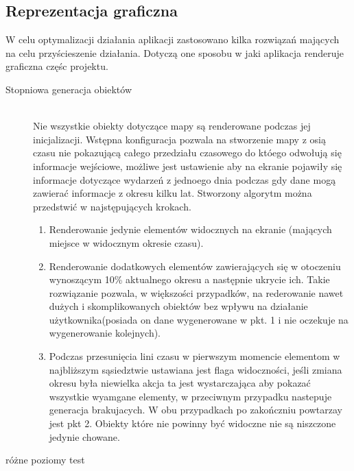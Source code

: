 \subsection{Reprezentacja graficzna}
\label{subsec:showing}

W celu optymalizacji działania aplikacji zastosowano kilka rozwiązań mających na celu przyścieszenie działania. Dotyczą one sposobu w jaki aplikacja renderuje graficzna częśc projektu.


\begin{description}
\item[Stopniowa generacja obiektów]\hfill \\
Nie wszystkie obiekty dotyczące mapy są renderowane podczas jej inicjalizacji. Wstępna konfiguracja pozwala na stworzenie mapy z osią czasu nie pokazującą całego przedziału czasowego do któego odwołują się informacje wejściowe, możliwe jest ustawienie aby na ekranie pojawiły się informacje dotyczące wydarzeń z jednoego dnia podczas gdy dane mogą zawierać informacje z okresu kilku lat. Stworzony algorytm można przedstwić w najstępujących krokach.

\begin{enumerate}
\item
Renderowanie jedynie elementów widocznych na ekranie (mających miejsce w widocznym okresie czasu).

\item
Renderowanie dodatkowych elementów zawierających się w otoczeniu wynoszącym 10\% aktualnego okresu a następnie ukrycie ich. Takie rozwiązanie pozwala, w większości przypadków, na rederowanie nawet dużych i skomplikowanych obiektów bez wpływu na działanie użytkownika(posiada on dane wygenerowane w pkt. 1 i nie oczekuje na wygenerowanie kolejnych).

\item
Podczas przesunięcia lini czasu w pierwszym momencie elementom w najbliższym sąsiedztwie ustawiana jest flaga widoczności, jeśli zmiana okresu była niewielka akcja ta jest wystarczająca aby pokazać wszystkie wyamgane elementy, w przeciwnym przypadku nastepuje generacja brakujacych. W obu przypadkach po zakończniu powtarzay jest pkt 2. Obiekty które nie powinny być widoczne nie są niszczone jedynie chowane.

\end{enumerate}

\item[różne poziomy test]\hfill \\

\end{description}
